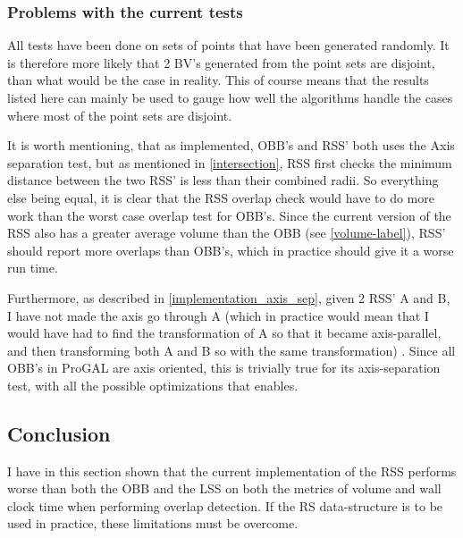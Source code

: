 \subsubsection{Problems with the current tests}
\label{test_problems}
All tests have been done on sets of points that have been generated randomly. It is therefore more likely that 2 BV's generated from the point sets are disjoint, than what would be the case in reality. This of course means that the results listed here can mainly be used to gauge how well the algorithms handle the cases where most of the point sets are disjoint.

It is worth mentioning, that as implemented, OBB's and RSS' both uses the Axis separation test, but as mentioned in \ref{intersection}, RSS first checks the minimum distance between the two RSS' is less than their combined radii. So everything else being equal, it is clear that the RSS overlap check would have to do more work than the worst case overlap test for OBB's. Since the current version of the RSS also has a greater average volume than the OBB (see \ref{volume-label}), RSS' should report more overlaps than OBB's, which in practice should give it a worse run time.
 
Furthermore, as described in \ref{implementation_axis_sep}, given 2 RSS' A and B, I have not made the axis go through A (which in practice would mean that I would have had to find the transformation of A so that it became axis-parallel, and then transforming both A and B so with the same transformation) . Since all OBB's in ProGAL are axis oriented, this is trivially true for its axis-separation test, with all the possible optimizations that enables.

\subsection{Conclusion}
I have in this section shown that the current implementation of the RSS performs worse than both the OBB and the LSS on both the metrics of volume and wall clock time when performing overlap detection. If the RS data-structure is to be used in practice, these limitations must be overcome.
